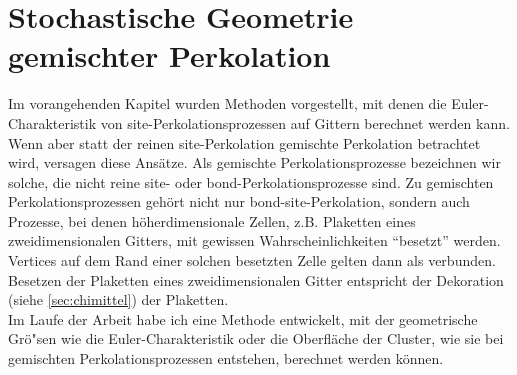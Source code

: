 

\chapter{Stochastische Geometrie gemischter Perkolation}
\label{sec:mixed}

Im vorangehenden Kapitel wurden Methoden vorgestellt, mit denen die Euler-Charak\-teris\-tik von site-Perkolationsprozessen auf Gittern berechnet werden kann. Wenn aber statt der reinen site-Perkolation gemischte Perkolation betrachtet wird, versagen diese Ans\"atze. Als gemischte Perkolationsprozesse bezeichnen wir solche, die nicht reine site- oder bond-Perkolationsprozesse sind. Zu gemischten Perkolationsprozessen geh\"ort nicht nur bond-site-Perkolation, sondern auch Prozesse, bei denen h\"oherdimensionale Zellen, z.B. Plaketten eines zweidimensionalen Gitters, mit gewissen Wahrscheinlichkeiten ``besetzt'' werden. Vertices auf dem Rand einer solchen besetzten Zelle gelten dann als verbunden. Besetzen der Plaketten eines zweidimensionalen Gitter entspricht der Dekoration (siehe \ref{sec:chimittel}) der Plaketten.
\\Im Laufe der Arbeit habe ich eine Methode entwickelt, mit der geometrische Gr\"o"sen wie die Euler-Charakteristik oder die Oberfl\"ache der Cluster, wie sie bei gemischten Perkolationsprozessen entstehen, berechnet werden k\"onnen. 


